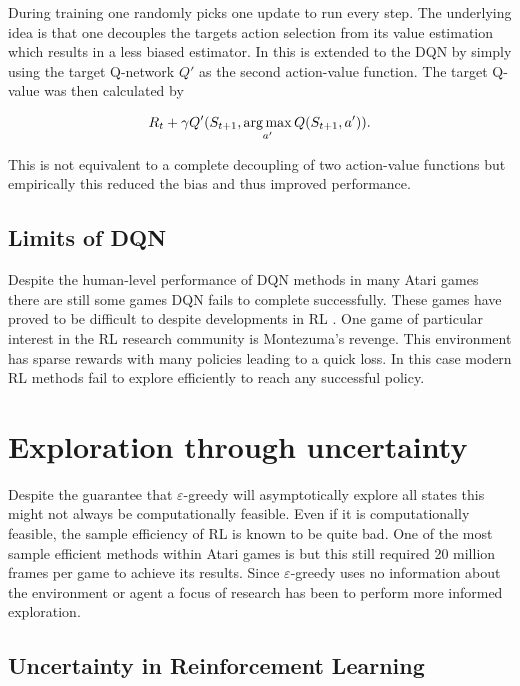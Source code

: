 During training one randomly picks one update to run every step. The underlying idea is that one decouples the targets action selection from its value estimation which results in a less biased estimator. In \cite{hasselt_2015} this is extended to the DQN by simply using the target Q-network $Q'$ as the second action-value function. The target Q-value was then calculated by

\begin{equation}
    R_t + \gamma Q'(S_{t+1}, \operatorname*{arg\,max}_{a'}Q(S_{t+1}, a')).
\end{equation}

This is not equivalent to a complete decoupling of two action-value functions but empirically this reduced the bias and thus improved performance. 

\subsection{Limits of DQN}

Despite the human-level performance of DQN methods in many Atari games \citep{mnih_2015} there are still some games DQN fails to complete successfully. These games have proved to be difficult to despite developments in RL \citep{mnih_2016, schulman_2017, hessel_2017}. One game of particular interest in the RL research community is Montezuma's revenge. This environment has sparse rewards with many policies leading to a quick loss. In this case modern RL methods fail to explore efficiently to reach any successful policy.

\section{Exploration through uncertainty}

Despite the guarantee that $\varepsilon$-greedy will asymptotically explore all states this might not always be computationally feasible. Even if it is computationally feasible, the sample efficiency of RL is known to be quite bad. One of the most sample efficient methods within Atari games is \cite{hessel_2017} but this still required 20 million frames per game to achieve its results. Since $\varepsilon$-greedy uses no information about the environment or agent a focus of research has been to perform more informed exploration. 

\subsection{Uncertainty in Reinforcement Learning}

